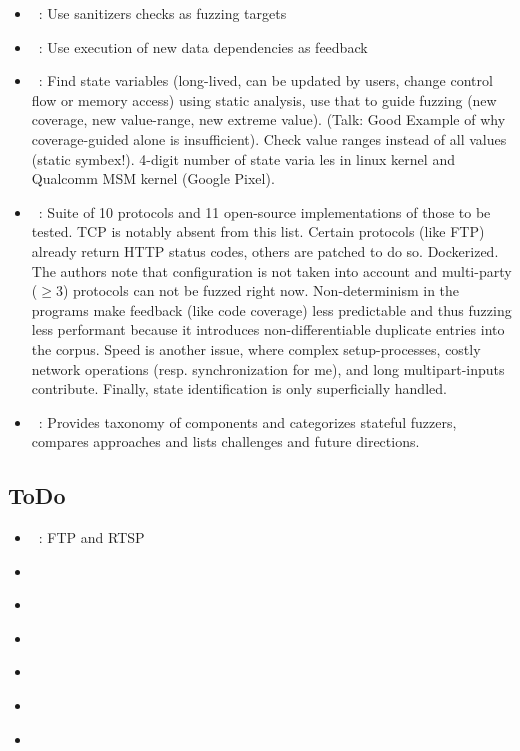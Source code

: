 \documentclass{article}
\let\savedCite=\cite
\renewcommand{\cite}{\unskip~\savedCite}
\begin{document}
\begin{multicols}{2}
\begin{itemize}
    \item {}\cite{ParmeSan}: Use sanitizers checks as fuzzing targets
    \item {}\cite{DDFuzz}: Use execution of new data dependencies as feedback
    \item {}\cite{StateFuzz}: Find state variables (long-lived, can be updated by users, change control flow or memory access) using static analysis, use that to guide fuzzing (new coverage, new value-range, new extreme value). (Talk: Good Example of why coverage-guided alone is insufficient). Check value ranges instead of all values (static symbex!). 4-digit number of state varia les in linux kernel and Qualcomm MSM kernel (Google Pixel).
    \item {}\cite{ProFuzzBench}: Suite of 10 protocols and 11 open-source implementations of those to be tested. TCP is notably absent from this list. Certain protocols (like FTP) already return HTTP status codes, others are patched to do so. Dockerized. The authors note that configuration is not taken into account and multi-party ($\geq 3$) protocols can not be fuzzed right now. Non-determinism in the programs make feedback (like code coverage) less predictable and thus fuzzing less performant because it introduces non-differentiable duplicate entries into the corpus. Speed is another issue, where complex setup-processes, costly network operations (resp. synchronization for me), and long multipart-inputs contribute. Finally, state identification is only superficially handled.
    \item {}\cite{StatefulReview}: Provides taxonomy of components and categorizes stateful fuzzers, compares approaches and lists challenges and future directions.
  \end{itemize}

  \subsection{ToDo}
  \begin{itemize}
    \item {}\cite{AFLNET}: FTP and RTSP
    \item {}\cite{Autofuzz}
    \item {}\cite{EPF}
    \item {}\cite{ModelBased}
    \item {}\cite{GANFuzz}
    \item {}\cite{TCPFuzz}
    \item {}\cite{FitM}
  \end{itemize}


\end{multicols}
\end{document}
